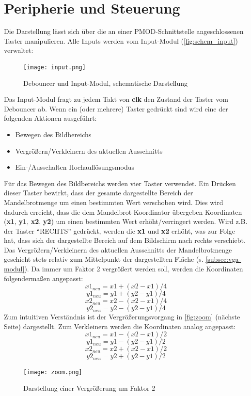 \documentclass[a4paper,12pt,onesided]{report}
\begin{document}
\section{Peripherie und Steuerung}
\label{sec:peripheriesteuerung}
Die Darstellung lässt sich über die an einer PMOD-Schnittstelle angeschlossenen Taster manipulieren.
Alle Inputs werden vom Input-Modul (\autoref{fig:schem_input}) verwaltet:
\begin{figure}[H]
	\centering
	\texttt{[image: input.png]}
	\caption{Debouncer und Input-Modul, schematische Darstellung}
	\label{fig:schem_input}
\end{figure}
Das Input-Modul fragt zu jedem Takt von \textbf{clk} den Zustand der Taster vom Debouncer ab.
Wenn ein (oder mehrere) Taster gedrückt sind wird eine der folgenden Aktionen ausgeführt:
\begin{itemize}
	\item Bewegen des Bildbereichs
	\item Vergrößern/Verkleinern des aktuellen Ausschnitts
	\item Ein-/Ausschalten Hochauflösungsmodus
\end{itemize}
Für das Bewegen des Bildbereichs werden vier Taster verwendet.
Ein Drücken dieser Taster bewirkt, dass der gesamte dargestellte Bereich der Mandelbrotmenge um einen bestimmten Wert verschoben wird.
Dies wird dadurch erreicht, dass die dem Mandelbrot-Koordinator übergeben Koordinaten (\textbf{x1}, \textbf{y1}, \textbf{x2}, \textbf{y2}) um einen bestimmten Wert erhöht/verringert werden.
Wird z.B. der Taster "`RECHTS"' gedrückt, werden die \textbf{x1} und \textbf{x2} erhöht, was zur Folge hat, dass sich der dargestellte Bereich auf dem Bildschirm nach rechts verschiebt.\\
Das Vergrößern/Verkleinern des aktuellen Ausschnitts der Mandelbrotmenge geschieht stets relativ zum Mittelpunkt der dargestellten Fläche (s. \autoref{subsec:vga-modul}).
Da immer um Faktor 2 vergrößert werden soll, werden die Koordinaten folgendermaßen angepasst:
\[x1_{neu} = x1 + (x2-x1)/4\]
\[y1_{neu} = y1 + (y2-y1)/4\]
\[x2_{neu} = x2 - (x2-x1)/4\]
\[y2_{neu} = y2 - (y2-y1)/4\]
Zum intuitiven Verständnis ist der Vergrößerungsvorgang in \autoref{fig:zoom} (nächste Seite) dargestellt.
Zum Verkleinern werden die Koordinaten analog angepasst:
\[x1_{neu} = x1 - (x2-x1)/2\]
\[y1_{neu} = y1 - (y2-y1)/2\]
\[x2_{neu} = x2 + (x2-x1)/2\]
\[y2_{neu} = y2 + (y2-y1)/2\]
\begin{figure}[H]
	\centering
	\texttt{[image: zoom.png]}
	\caption{Darstellung einer Vergrößerung um Faktor 2}
	\label{fig:zoom}
\end{figure}
\end{document}
